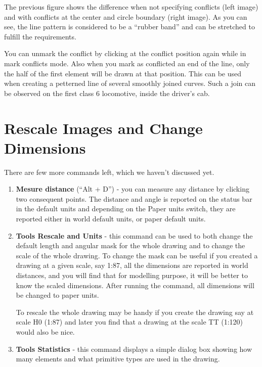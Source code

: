 The previous figure shows the difference when not specifying conflicts (left
image) and with conflicts at the center and circle boundary (right image).
As you can see, the line pattern is considered to be a ``rubber band'' and
can be stretched to fulfill the requirements.

You can unmark the conflict by clicking at the conflict position again
while in mark conflicts mode. Also when you mark as conflicted an end of
the line, only the half of the first element will be drawn at that position.
This can be used when creating a petterned line of several smoothly joined
curves. Such a join can be observed on the first class 6 locomotive, inside
the driver's cab.

\section{Rescale Images and Change Dimensions}

There are few more commands left, which we haven't discussed yet.
\begin{enumerate}
\item \textbf{Mesure distance} (``Alt + D'') - you can measure any distance
by clicking two consequent points. The distance and angle is reported on
the status bar in the default units and depending on the Paper units switch,
they are reported either in world default units, or paper default units.
\item \textbf{Tools \lar{} Rescale and Units} - this command can be used to
both change the default length and angular mask for the whole drawing and to
change the scale of the whole drawing. To change the mask can be useful if you
created a drawing at a given scale, say 1:87, all the dimensions are reported
in world distances, and you will find that for modelling purpose, it will be
better to know the scaled dimensions. After running the command, all dimensions
will be changed to paper units.

To rescale the whole drawing may be handy if you create the drawing say at
scale H0 (1:87) and later you find that a drawing at the scale TT (1:120) would
also be nice.
\item \textbf{Tools \lar{} Statistics} - this command displays a simple dialog box showing how
many elements and what primitive types are used in the drawing.
\end{enumerate}


